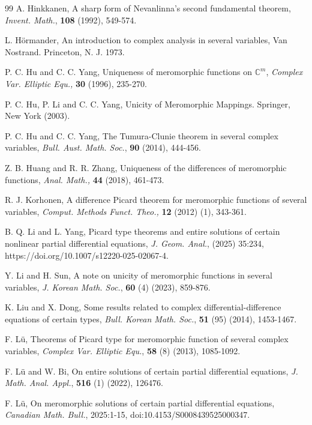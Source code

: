 \documentclass[11pt,reqno]{amsart}
\numberwithin{equation}{section}
\begin{document}
\begin{thebibliography}{99}
 {\sc A. Hinkkanen}, A sharp form of Nevanlinna's second fundamental theorem, \textit{Invent. Math.}, \textbf{108} (1992), 549-574.

 {\sc L. H\"{o}rmander}, An introduction to complex analysis in several variables, Van Nostrand. Princeton, N. J. 1973.

 {\sc P. C. Hu} and {\sc C. C. Yang}, Uniqueness of meromorphic functions on $\mathbb{C}^m$, \textit{Complex Var. Elliptic Equ.,} \textbf{30} (1996), 235-270.

 {\sc P. C. Hu}, {\sc P. Li} and {\sc C. C. Yang}, Unicity of Meromorphic Mappings. Springer, New York (2003).

 {\sc P. C. Hu} and {\sc C. C. Yang}, The Tumura-Clunie theorem in several complex variables, \textit{Bull. Aust. Math. Soc.}, \textbf{90} (2014), 444-456.

 {\sc Z. B. Huang} and {\sc R. R. Zhang}, Uniqueness of the differences of meromorphic functions, \textit{Anal. Math.,} \textbf{44} (2018), 461-473. 

 {\sc R. J. Korhonen}, A difference Picard theorem for meromorphic functions of several variables, \textit{Comput. Methods Funct. Theo.,}  \textbf{12} (2012) (1), 343-361.

 {\sc B. Q. Li} and {\sc L. Yang}, Picard type theorems and entire solutions of certain nonlinear partial differential equations, \textit{J. Geom. Anal.}, (2025) 35:234, https://doi.org/10.1007/s12220-025-02067-4.

 {\sc Y. Li} and {\sc H. Sun}, A note on unicity of meromorphic functions in several variables, \textit{J. Korean Math. Soc.}, \textbf{60} (4) (2023), 859-876.

 {\sc K. Liu} and {\sc X. Dong}, Some results related to complex differential-difference equations of certain types, \textit{Bull. Korean Math. Soc.}, \textbf{51} (95) (2014), 1453-1467.

 {\sc F. L\"{u}}, Theorems of Picard type for meromorphic function of several complex variables, \textit{Complex Var. Elliptic Equ.}, \textbf{58} (8) (2013), 1085-1092.

 {\sc F. L\"{u}} and {\sc W. Bi}, On entire solutions of certain partial differential equations, \textit{J. Math. Anal. Appl.}, \textbf{516} (1) (2022), 126476.

 {\sc F. L\"{u}}, On meromorphic solutions of certain partial differential equations, \textit{Canadian Math. Bull.}, 2025:1-15, doi:10.4153/S0008439525000347.


\end{thebibliography}
\end{document}
